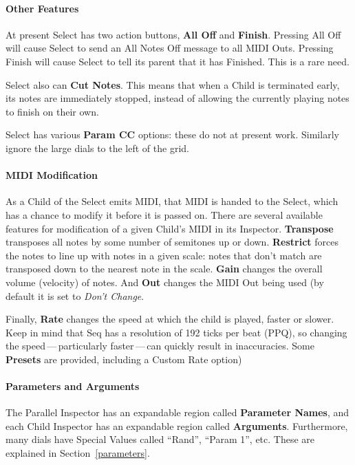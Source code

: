 \documentclass[twoside,10pt]{article}
\begin{document}
\paragraph{Other Features}

At present Select has two action buttons, {\bf All Off} and {\bf Finish}.  Pressing All Off will cause Select to send an All Notes Off message to all MIDI Outs.  Pressing Finish will cause Select to tell its parent that it has Finished.  This is a rare need.

Select also can {\bf Cut Notes}.  This means that when a Child is terminated early, its notes are immediately stopped, instead of allowing the currently playing notes to finish on their own.

Select has various {\bf Param CC} options: {\color{red} these do not at present work.}  Similarly ignore the large dials to the left of the grid.

\paragraph{MIDI Modification}

As a Child of the Select emits MIDI, that MIDI is handed to the Select, which has a chance to modify it before it is passed on.  There are several available features for modification of a given Child's MIDI in its Inspector.  {\bf Transpose} transposes all notes by some number of semitones up or down.  {\bf Restrict} forces the notes to line up with notes in a given scale: notes that don't match are transposed down to the nearest note in the scale.  {\bf Gain} changes the overall volume (velocity) of notes.  And {\bf Out} changes the MIDI Out being used (by default it is set to {\it Don't Change}.

Finally, {\bf Rate} changes the speed at which the child is played, faster or slower.  Keep in mind that Seq has a resolution of 192 ticks per beat (PPQ), so changing the speed\,---\,particularly faster\,---\,can quickly result in inaccuracies.    Some {\bf Presets} are provided, including a Custom Rate option)


\paragraph{Parameters and Arguments}

The Parallel Inspector has an expandable region called {\bf Parameter Names}, and each Child Inspector has an expandable region called {\bf Arguments}. Furthermore, many dials have Special Values called ``Rand'', ``Param 1'', etc.  These are explained in Section~\ref{parameters}.
\end{document}
